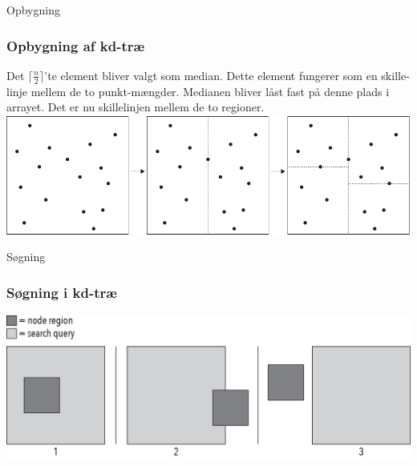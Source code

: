 \documentclass[pdf]{beamer}
\begin{document}
\begin{frame}{Opbygning}
  \frametitle{Opbygning af kd-træ}
  Det $\lceil \frac{n}{2} \rceil$'te element bliver valgt som median. Dette element fungerer som en skille-linje mellem de to punkt-mængder. Medianen bliver låst fast på denne plads i arrayet. Det er nu skillelinjen mellem de to regioner.
  \includegraphics[scale=0.75]{pictures/kd_subdivision-eps-converted-to.pdf}
\end{frame}


\begin{frame}{Søgning}
  \frametitle{Søgning i kd-træ}
  \begin{center}
    \includegraphics[scale=0.75]{pictures/search_query_overlap.png}
  \end{center}
\end{frame}
\end{document}
